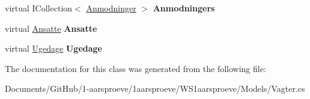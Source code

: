 \begin{DoxyCompactItemize}
\item 
\hypertarget{class_w_s1aarsproeve_1_1_vagter_a43667faa1f3f99ab745b8d36acc7f194}{}virtual I\+Collection$<$ \hyperlink{class_w_s1aarsproeve_1_1_anmodninger}{Anmodninger} $>$ {\bfseries Anmodningers}\label{class_w_s1aarsproeve_1_1_vagter_a43667faa1f3f99ab745b8d36acc7f194}

\item 
\hypertarget{class_w_s1aarsproeve_1_1_vagter_a2793f3c463e74e54f5c8603a43975801}{}virtual \hyperlink{class_w_s1aarsproeve_1_1_ansatte}{Ansatte} {\bfseries Ansatte}\label{class_w_s1aarsproeve_1_1_vagter_a2793f3c463e74e54f5c8603a43975801}

\item 
\hypertarget{class_w_s1aarsproeve_1_1_vagter_a42b24975fdaae325592096c66731bc36}{}virtual \hyperlink{class_w_s1aarsproeve_1_1_ugedage}{Ugedage} {\bfseries Ugedage}\label{class_w_s1aarsproeve_1_1_vagter_a42b24975fdaae325592096c66731bc36}

\end{DoxyCompactItemize}


The documentation for this class was generated from the following file\+:\begin{DoxyCompactItemize}
\item 
Documents/\+Git\+Hub/1-\/aarsproeve/1aarsproeve/\+W\+S1aarsproeve/\+Models/Vagter.\+cs\end{DoxyCompactItemize}
